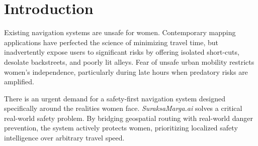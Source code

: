 \section{Introduction}
Existing navigation systems are unsafe for women. Contemporary mapping applications have perfected the science of minimizing travel time, but inadvertently expose users to significant risks by offering isolated short-cuts, desolate backstreets, and poorly lit alleys. Fear of unsafe urban mobility restricts women's independence, particularly during late hours when predatory risks are amplified. 

There is an urgent demand for a safety-first navigation system designed specifically around the realities women face. \textit{SuraksaMarga.ai} solves a critical real-world safety problem. By bridging geospatial routing with real-world danger prevention, the system actively protects women, prioritizing localized safety intelligence over arbitrary travel speed.
